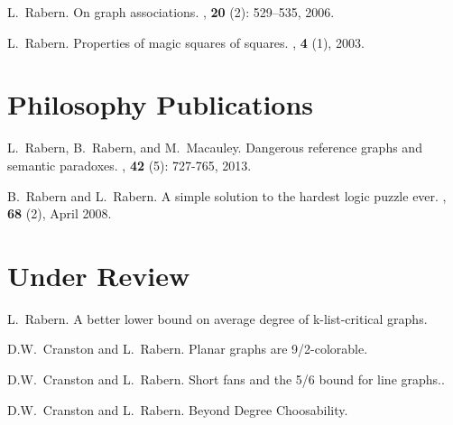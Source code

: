 \documentclass[margin,line]{res}
\begin{document}
\begin{resume}
\begin{enumerate}[{[}1{]}]
\smallskip

\item L.~Rabern.
\newblock On graph associations.
, \textbf{20}  (2): 529--535,
  2006.

\smallskip

\item L.~Rabern.
\newblock Properties of magic squares of squares.
, \textbf{4}
  (1), 2003. 

\end{enumerate}

\section{\sc Philosophy Publications}
\begin{enumerate}[{[}1{]}]
	\setcounter{enumi}{29}
\item
L.~Rabern, B.~Rabern, and M.~Macauley.
\newblock Dangerous reference graphs and semantic paradoxes.
, \textbf{42} (5): 727-765, 2013.

\smallskip

\item
B.~Rabern and L.~Rabern.
\newblock A simple solution to the hardest logic puzzle ever. 
, \textbf{68} (2), April 2008.

\end{enumerate}
\section{\sc Under Review}

\begin{enumerate}[{[}1{]}]
\setcounter{enumi}{31}


\item
L.~Rabern.
\newblock A better lower bound on average degree of k-list-critical graphs.

\smallskip

\item
D.W.~Cranston and L.~Rabern.
\newblock Planar graphs are 9/2-colorable.

\smallskip

\item
D.W.~Cranston and L.~Rabern.
\newblock Short fans and the 5/6 bound for line graphs..

\smallskip

\item
D.W.~Cranston and L.~Rabern.
\newblock Beyond Degree Choosability.


\end{enumerate}
\end{resume}
\end{document}
